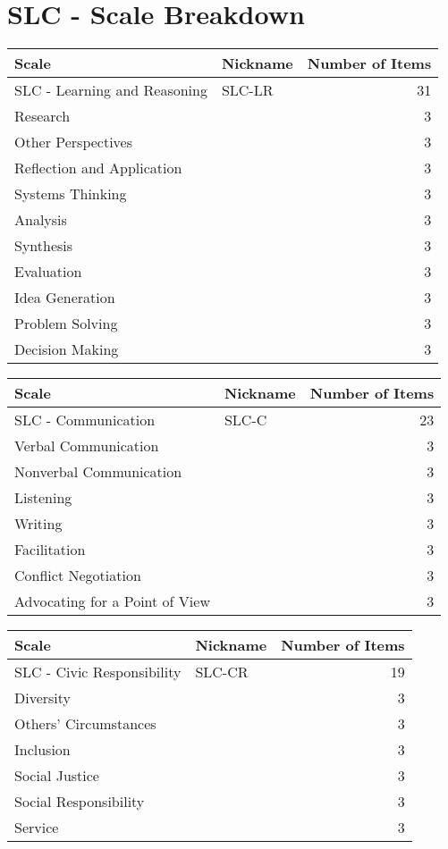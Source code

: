 \documentclass[11pt]{article}
\begin{document}
\section{SLC - Scale Breakdown}
\label{sec:orgc6d476d}

\begin{center}
\begin{tabular}{llr}
Scale & Nickname & Number of Items\\
\hline
SLC - Learning and Reasoning & SLC-LR & 31\\
\hline
Research &  & 3\\
Other Perspectives &  & 3\\
Reflection and Application &  & 3\\
Systems Thinking &  & 3\\
Analysis &  & 3\\
Synthesis &  & 3\\
Evaluation &  & 3\\
Idea Generation &  & 3\\
Problem Solving &  & 3\\
Decision Making &  & 3\\
\end{tabular}
\end{center}

\begin{center}
\begin{tabular}{llr}
Scale & Nickname & Number of Items\\
\hline
SLC - Communication & SLC-C & 23\\
\hline
Verbal Communication &  & 3\\
Nonverbal Communication &  & 3\\
Listening &  & 3\\
Writing &  & 3\\
Facilitation &  & 3\\
Conflict Negotiation &  & 3\\
Advocating for a Point of View &  & 3\\
\end{tabular}
\end{center}

\begin{center}
\begin{tabular}{llr}
Scale & Nickname & Number of Items\\
\hline
SLC - Civic Responsibility & SLC-CR & 19\\
\hline
Diversity &  & 3\\
Others’ Circumstances &  & 3\\
Inclusion &  & 3\\
Social Justice &  & 3\\
Social Responsibility &  & 3\\
Service &  & 3\\
\end{tabular}
\end{center}
\end{document}
